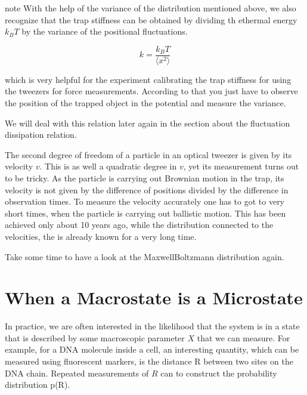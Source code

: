 \documentclass[letterpaper,10pt,english]{sphinxmanual}
\begin{document}
\begin{sphinxadmonition}{note}{}
\sphinxAtStartPar
With the help of the variance of the distribution mentioned above, we also recognize that the trap stiffness can be obtained by dividing th ethermal energy \(k_B T\) by the variance of the positional fluctuations.

\sphinxAtStartPar
\begin{equation}
k=\frac{k_B T}{\langle x^2\rangle }
\end{equation}

\begin{DUlineblock}{0em}
\item[] which is very helpful for the experiment calibrating the trap stiffness for using the tweezers for force measurements. According to that you just have to observe the position of the trapped object in the potential and measure the variance.
\item[] We will deal with this relation later again in the section about the fluctuation dissipation relation.
\end{DUlineblock}

\sphinxAtStartPar
The second degree of freedom of a particle in an optical tweezer is given by its velocity \(v\). This is as well a quadratic degree in \(v\), yet its measurement turns out to be tricky. As the particle is carrying out Brownian motion in the trap, its velocity is not given by the difference of positions divided by the difference in observation times. To measure the velocity accurately one has to got to very short times, when the particle is carrying out ballistic motion. This has been
achieved only about 10 years ago, while the distribution connected to the velocities, the  is already known for a very long time.

\sphinxAtStartPar
Take some time to have a look at the Maxwell\sphinxhyphen{}Boltzmann distribution again.
\end{sphinxadmonition}


\chapter{When a Macrostate is a Microstate}
\label{\detokenize{notebooks/L3/1_Equipartition:When-a-Macrostate-is-a-Microstate}}
\sphinxAtStartPar
In practice, we are often interested in the likelihood that the system is in a state that is described by some macroscopic parameter \(X\) that we can measure. For example, for a DNA molecule inside a cell, an interesting quantity, which can be measured using fluorescent markers, is the distance R between two sites on the DNA chain. Repeated measurements of \(R\) can to construct the probability distribution p(R).
\end{document}
